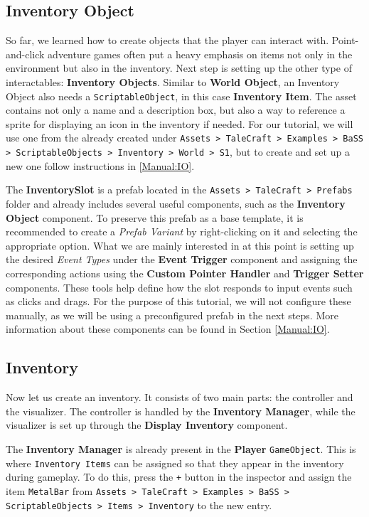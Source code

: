 \subsection{Inventory Object} 
So far, we learned how to create objects that the player can interact with. Point-and-click adventure games often put a heavy emphasis on items not only in the environment but also in the inventory. Next step is setting up the other type of interactables: \textbf{Inventory Objects}. Similar to \textbf{World Object}, an Inventory Object also needs a \verb|ScriptableObject|, in this case \textbf{Inventory Item}. The asset contains not only a name and a description box, but also a way to reference a sprite for displaying an icon in the inventory if needed. For our tutorial, we will use one from the already created under \texttt{Assets > TaleCraft > Examples > BaSS > ScriptableObjects > Inventory > World > S1}, but to create and set up a new one follow instructions in \ref{Manual:IO}.

The \textbf{InventorySlot} is a prefab located in the \texttt{Assets > TaleCraft > Prefabs} folder and already includes several useful components, such as the \textbf{Inventory Object} component. To preserve this prefab as a base template, it is recommended to create a \textit{Prefab Variant} by right-clicking on it and selecting the appropriate option. What we are mainly interested in at this point is setting up the desired \textit{Event Types} under the \textbf{Event Trigger} component and assigning the corresponding actions using the \textbf{Custom Pointer Handler} and \textbf{Trigger Setter} components. These tools help define how the slot responds to input events such as clicks and drags. For the purpose of this tutorial, we will not configure these manually, as we will be using a preconfigured prefab in the next steps. More information about these components can be found in Section \ref{Manual:IO}.


\subsection{Inventory}
Now let us create an inventory. It consists of two main parts: the controller and the visualizer. The controller is handled by the \textbf{Inventory Manager}, while the visualizer is set up through the \textbf{Display Inventory} component.

The \textbf{Inventory Manager} is already present in the \textbf{Player} \verb|GameObject|. This is where \texttt{Inventory Items} can be assigned so that they appear in the inventory during gameplay. To do this, press the \texttt{+} button in the inspector and assign the item \verb|MetalBar| from \texttt{Assets > TaleCraft > Examples > BaSS > ScriptableObjects > Items > Inventory} to the new entry.

